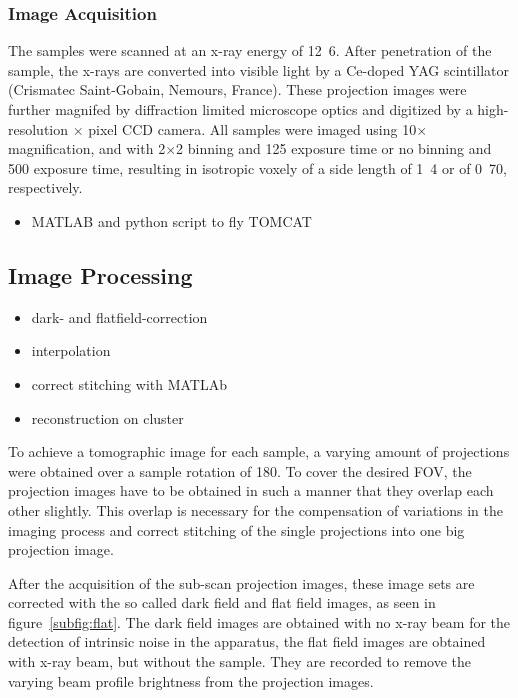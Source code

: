 \subsubsection{Image Acquisition}
The samples were scanned at an x-ray energy of \unit{12.6}{\kilo\electronvolt}. After penetration of the sample, the x-rays are converted into visible light by a Ce-doped YAG scintillator (Crismatec Saint-Gobain, Nemours, France). These projection images were further magnifed by diffraction limited microscope optics and digitized by a high-resolution $\times$ pixel CCD camera. All samples were imaged using 10$\times$ magnification, and with 2$\times$2 binning and \unit{125}{\milli\second} exposure time or no binning and \unit{500}{\milli\second} exposure time, resulting in isotropic voxely of a side length of \unit{1.4}{\micro\meter} or of \unit{0.70}{\micro\meter}, respectively.

\begin{itemize}
	\item MATLAB and python script to fly TOMCAT
\end{itemize}

\subsection{Image Processing}
\label{subsec:image processing}
\begin{itemize}
	\item dark- and flatfield-correction
	\item interpolation
	\item correct stitching with MATLAb
	\item reconstruction on cluster
\end{itemize}
To achieve a tomographic image for each sample, a varying amount of projections were obtained over a sample rotation of \unit{180}{\degree}. To cover the desired FOV, the projection images have to be obtained in such a manner that they overlap each other slightly. This overlap is necessary for the compensation of variations in the imaging process and correct stitching of the single projections into one big projection image. 

After the acquisition of the sub-scan projection images, these image sets are corrected with the so called dark field and flat field images, as seen in figure~\ref{subfig:flat}. The dark field images are obtained with no x-ray beam for the detection of intrinsic noise in the apparatus, the flat field images are obtained with x-ray beam, but without the sample. They are recorded to remove the varying beam profile brightness from the projection images.

